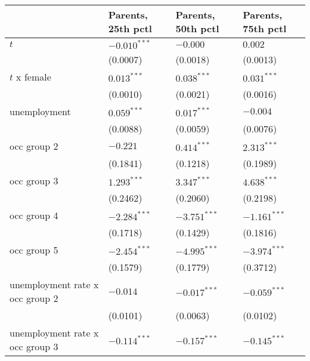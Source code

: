 \begin{tabular}{llll}
\toprule
{} & Parents, 25th pctl & Parents, 50th pctl & Parents, 75th pctl \\
\midrule
$t$                                      &     $-0.010^{***}$ &           $-0.000$ &            $0.002$ \\
                                         &           (0.0007) &           (0.0018) &           (0.0013) \\
$t$ x female                             &      $0.013^{***}$ &      $0.038^{***}$ &      $0.031^{***}$ \\
                                         &           (0.0010) &           (0.0021) &           (0.0016) \\
unemployment                             &      $0.059^{***}$ &      $0.017^{***}$ &           $-0.004$ \\
                                         &           (0.0088) &           (0.0059) &           (0.0076) \\
occ group 2                              &           $-0.221$ &      $0.414^{***}$ &      $2.313^{***}$ \\
                                         &           (0.1841) &           (0.1218) &           (0.1989) \\
occ group 3                              &      $1.293^{***}$ &      $3.347^{***}$ &      $4.638^{***}$ \\
                                         &           (0.2462) &           (0.2060) &           (0.2198) \\
occ group 4                              &     $-2.284^{***}$ &     $-3.751^{***}$ &     $-1.161^{***}$ \\
                                         &           (0.1718) &           (0.1429) &           (0.1816) \\
occ group 5                              &     $-2.454^{***}$ &     $-4.995^{***}$ &     $-3.974^{***}$ \\
                                         &           (0.1579) &           (0.1779) &           (0.3712) \\
unemployment rate x occ group 2          &           $-0.014$ &     $-0.017^{***}$ &     $-0.059^{***}$ \\
                                         &           (0.0101) &           (0.0063) &           (0.0102) \\
unemployment rate x occ group 3          &     $-0.114^{***}$ &     $-0.157^{***}$ &     $-0.145^{***}$ \\

\end{tabular}
